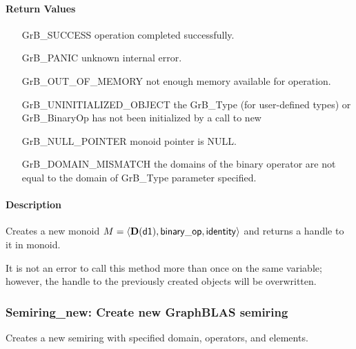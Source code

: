 \paragraph{Return Values}

\begin{itemize}[leftmargin=2.1in]
\item[{\sf GrB\_SUCCESS}]           operation completed successfully.
\item[{\sf GrB\_PANIC}]             unknown internal error.
\item[{\sf GrB\_OUT\_OF\_MEMORY}]          not enough memory available for operation.
\item[{\sf GrB\_UNINITIALIZED\_OBJECT}]          the {\sf GrB\_Type} (for user-defined types)
                                    or {\sf GrB\_BinaryOp} has not been
                                    initialized by a call to {\sf new}
\item[{\sf GrB\_NULL\_POINTER}]    {\sf monoid} pointer is {\sf NULL}.
\item[{\sf GrB\_DOMAIN\_MISMATCH}]  the domains of the binary operator are not   
                                    equal to the domain of {\sf GrB\_Type} parameter specified.
\end{itemize}

\paragraph{Description}

Creates a new monoid $M = \langle \bold{D}({\sf d1}), {\sf binary\_op}, 
{\sf identity} \rangle$ and returns a handle to it in {\sf monoid}.

It is not an error to call this method more than once on the same variable;  
however, the handle to the previously created objects will be overwritten. 

\subsubsection{{\sf Semiring\_new}: Create new GraphBLAS semiring}

Creates a new semiring with specified domain, operators, and elements.

\paragraph{\syntax}

